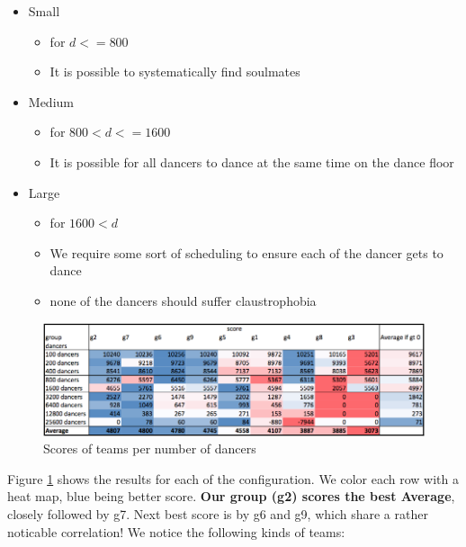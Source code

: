\begin{itemize}
\tightlist
\item
  Small

  \begin{itemize}
  \tightlist
  \item
    for \(d<=800\)
  \item
    It is possible to systematically find soulmates
  \end{itemize}
\item
  Medium

  \begin{itemize}
  \tightlist
  \item
    for \(800 < d <=1600\)
  \item
    It is possible for all dancers to dance at the same time on the
    dance floor
  \end{itemize}
\item
  Large

  \begin{itemize}
  \tightlist
  \item
    for \(1600 < d\)
  \item
    We require some sort of scheduling to ensure each of the dancer gets
    to dance
  \item
    none of the dancers should suffer claustrophobia
  \end{itemize}
\end{itemize}

\begin{figure}[htbp]
\centering
\includegraphics{imgs/team-scores.png}
\caption{Scores of teams per number of dancers\label{team-scores}}
\end{figure}

Figure \ref{team-scores} shows the results for each of the
configuration. We color each row with a heat map, blue being better
score. \textbf{Our group (g2) scores the best Average}, closely followed
by g7. Next best score is by g6 and g9, which share a rather noticable
correlation! We notice the following kinds of teams:

